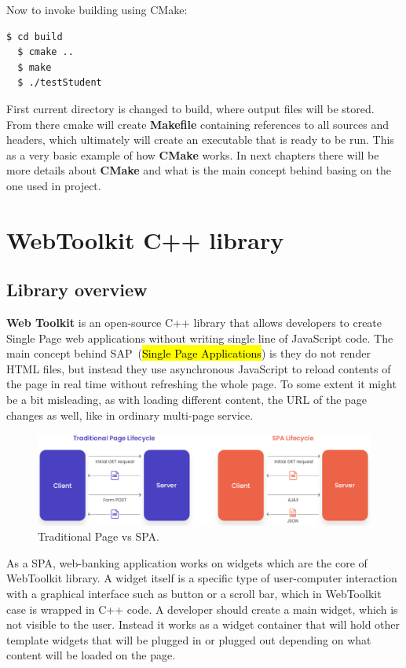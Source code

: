 \documentclass[a4paper,12pt]{book}
\newcommand\tab[1][1cm]{\hspace*{#1}}
\begin{document}
{{\noindent Now to invoke building using CMake:
\begin{lstlisting}[language=bash]
  $ cd build
  $ cmake ..
  $ make
  $ ./testStudent
\end{lstlisting}
  
\bigskip First current directory is changed to build, where output files will be stored. From there cmake will create \textbf{Makefile} containing references to all sources and headers, which ultimately will create an executable that is ready to be run. This as a very basic example of how \textbf{CMake} works. In next chapters there will be more details about \textbf{CMake} and what is the main concept behind basing on the one used in project. 

}

\chapter{WebToolkit C++ library}
\section{Library overview}
{\tab \textbf{Web Toolkit} is an open-source C++ library that allows developers to create Single Page web applications without writing single line of JavaScript code. The main concept behind SAP~\cite{singlepageapplications}(\hl{Single Page Applications}) is they do not render HTML files, but instead they use asynchronous JavaScript to reload contents of the page in real time without refreshing the whole page. To some extent it might be a bit misleading, as with loading different content, the URL of the page changes as well, like in ordinary multi-page service.

\begin{figure}[h]
  \centering
    \includegraphics[width=1.0\textwidth]{spa}
    \caption{Traditional Page vs SPA.}
\end{figure}

\bigskip
As a SPA, web-banking application works on widgets which are the core of WebToolkit library. A widget itself is a specific type of user-computer interaction with a graphical interface such as button or a scroll bar, which in WebToolkit case is wrapped in C++ code. A developer should create a main widget, which is not visible to the user. Instead it works as a widget container that will hold other template widgets that will be plugged in or plugged out depending on what content will be loaded on the page.  

}}
\end{document}
